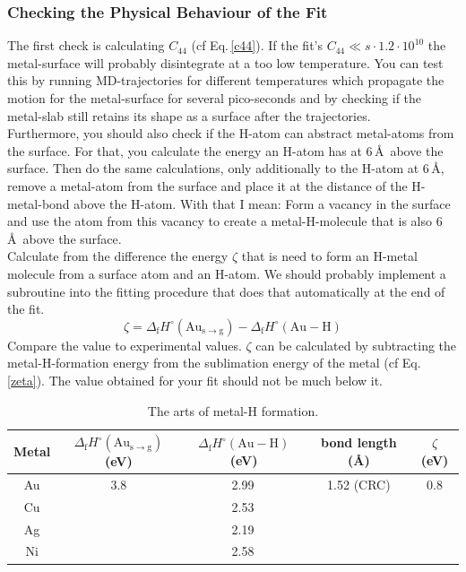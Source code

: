 \documentclass[11pt,oneside,a4paper, captions=nooneline, headsepline]{article}%
\begin{document}
\subsubsection*{Checking the Physical Behaviour of the Fit}
The first check is calculating $C_{44}$ (cf Eq.\,\ref{c44}). If the fit's $C_{44}\ll s\cdot1.2\cdot10^{10}$ the metal-surface will probably disintegrate at a too low temperature. You can test this by running MD-trajectories for different temperatures which propagate the motion for the metal-surface for several pico-seconds and by checking if the metal-slab still retains its shape as a surface after the trajectories.\\
Furthermore, you should also check if the H-atom can abstract metal-atoms from the surface. For that, you calculate the energy an H-atom has at 6\,\AA~above the surface. Then do the same calculations, only additionally to the H-atom at 6\,\AA, remove a metal-atom from the surface and place it at the distance of the H-metal-bond above the H-atom. With that I mean: Form a vacancy in the surface and use the atom from this vacancy to create a metal-H-molecule that is also 6\,\AA~above the surface.\\
Calculate from the difference the energy $\zeta$ that is need to form an H-metal molecule from a surface atom and an H-atom. We should probably implement a subroutine into the fitting procedure that does that automatically at the end of the fit.\\
\begin{equation}
\zeta = \Delta_\mathrm{f} H^\circ(\mathrm{Au_{s\rightarrow g}})-\Delta_\mathrm{f}H^\circ(\mathrm{Au-H})
\label{zeta}
\end{equation}
Compare the value to experimental values. $\zeta$ can be calculated by subtracting the metal-H-formation energy from the sublimation energy of the metal (cf Eq.\,\ref{zeta}). The value obtained for your fit should not be much below it.
\begin{table}[h!]
\centering
\caption{The arts of metal-H formation.}
\label{auh}
\begin{tabular}{ccccc}
\hline\hline
Metal&$\Delta_\mathrm{f} H^\circ(\mathrm{Au_{s\rightarrow g}})$(eV)&$\Delta_\mathrm{f}H^\circ(\mathrm{Au-H})$(eV)&bond length (\AA)&$\zeta$ (eV)\\
\hline
Au&3.8\cite{hildenbrand62}&2.99\,\cite{kant79}&1.52 (CRC)&0.8\\
Cu&&2.53\,\cite{kant79}&&\\
Ag&&2.19\,\cite{kant79}&&\\
Ni&&2.58\,\cite{kant79}&&\\
\hline\hline
\end{tabular}
\end{table}
\end{document}
